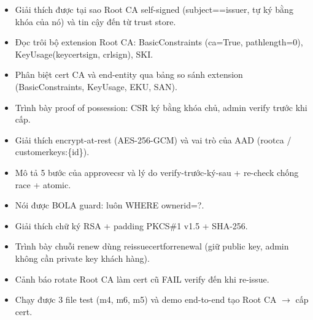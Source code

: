 \documentclass[12pt,a4paper]{article}
\newcommand{\code}[1]{{\ttfamily\small\def\_{\textunderscore\discretionary{}{}{}}#1}}
\begin{document}
\begin{itemize}
  \item[\textbf{$\square$}] Giải thích được tại sao Root CA self-signed
        (\code{subject==issuer}, tự ký bằng khóa của nó) và tin cậy đến từ trust
        store.
  \item[\textbf{$\square$}] Đọc trôi bộ extension Root CA: \code{BasicConstraints
        (ca=True, path\_length=0)}, \code{KeyUsage(key\_cert\_sign, crl\_sign)},
        SKI.
  \item[\textbf{$\square$}] Phân biệt cert CA và end-entity qua bảng so sánh
        extension (BasicConstraints, KeyUsage, EKU, SAN).
  \item[\textbf{$\square$}] Trình bày proof of possession: CSR ký bằng khóa chủ,
        admin verify trước khi cấp.
  \item[\textbf{$\square$}] Giải thích encrypt-at-rest (AES-256-GCM) và vai trò
        của AAD (\code{root\_ca} / \code{customer\_keys:\{id\}}).
  \item[\textbf{$\square$}] Mô tả 5 bước của \code{approve\_csr} và lý do
        verify-trước-ký-sau + re-check chống race + atomic.
  \item[\textbf{$\square$}] Nói được BOLA guard: luôn \code{WHERE owner\_id=?}.
  \item[\textbf{$\square$}] Giải thích chữ ký RSA + padding PKCS\#1 v1.5 +
        SHA-256.
  \item[\textbf{$\square$}] Trình bày chuỗi renew dùng
        \code{reissue\_cert\_for\_renewal} (giữ public key, admin không cần
        private key khách hàng).
  \item[\textbf{$\square$}] Cảnh báo rotate Root CA làm cert cũ FAIL verify đến
        khi re-issue.
  \item[\textbf{$\square$}] Chạy được 3 file test (\code{m4}, \code{m6},
        \code{m5}) và demo end-to-end tạo Root CA $\to$ cấp cert.
\end{itemize}
\end{document}

